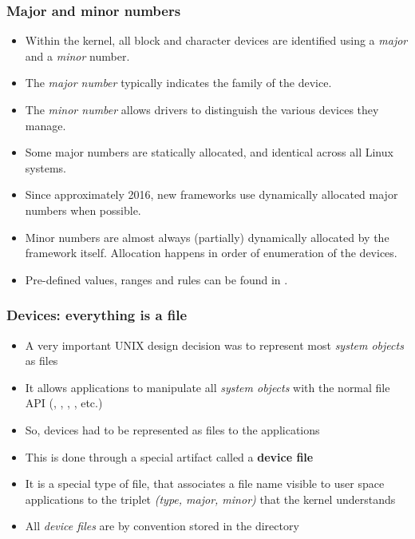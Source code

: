 \begin{frame}
  \frametitle{Major and minor numbers}
  \begin{itemize}
  \item Within the kernel, all block and character devices are
    identified using a {\em major} and a {\em minor} number.
  \item The {\em major number} typically indicates the family of the
    device.
  \item The {\em minor number} allows drivers to distinguish
    the various devices they manage.
  \item Some major numbers are statically allocated, and
    identical across all Linux systems.
  \item Since approximately 2016, new frameworks use dynamically allocated major
    numbers when possible.
  \item Minor numbers are almost always (partially) dynamically allocated
    by the framework itself. Allocation happens in order of enumeration of
    the devices.
  \item Pre-defined values, ranges and rules can be found in
    .
  \end{itemize}
\end{frame}

\begin{frame}
  \frametitle{Devices: everything is a file}
  \begin{itemize}
  \item A very important UNIX design decision was to represent most
    {\em system objects} as files
  \item It allows applications to manipulate all {\em system objects} with
    the normal file API (, , ,
    , etc.)
  \item So, devices had to be represented as files to the applications
  \item This is done through a special artifact called a {\bf device
      file}
  \item It is a special type of file, that associates a file name
    visible to user space applications to the triplet {\em (type,
      major, minor)} that the kernel understands
  \item All {\em device files} are by convention stored in the
     directory
  \end{itemize}
\end{frame}

